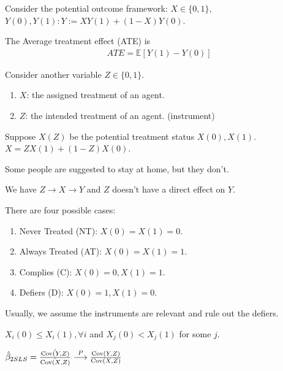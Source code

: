 \documentclass[11pt]{elegantbook}
\begin{document}
Consider the potential outcome framework: $X\in\{0,1\}$, $Y(0),Y(1): Y:=X Y(1)+(1-X)Y(0)$.

The Average treatment effect (ATE) is
\begin{equation}
    \begin{aligned}
        ATE=\mathbb{E}[Y(1)-Y(0)]
    \end{aligned}
    \nonumber
\end{equation}

Consider another variable $Z\in\{0,1\}$.
\begin{enumerate}
    \item $X$: the assigned treatment of an agent.
    \item $Z$: the intended treatment of an agent. (instrument)
\end{enumerate}

Suppose $X(Z)$ be the potential treatment status $X(0),X(1)$. $X=ZX(1)+(1-Z)X(0)$.

\begin{example}
    Some people are suggested to stay at home, but they don't.
\end{example}

We have $Z \rightarrow X \rightarrow Y$ and $Z$ doesn't have a direct effect on $Y$.

There are four possible cases:
\begin{enumerate}
    \item Never Treated (NT): $X(0)=X(1)=0$.
    \item Always Treated (AT): $X(0)=X(1)=1$.
    \item Complies (C): $X(0)=0,X(1)=1$.
    \item Defiers (D): $X(0)=1,X(1)=0$.
\end{enumerate}
Usually, we assume the instruments are relevant and rule out the defiers.
\begin{assumption}\label{ass:LATE}
    $X_i(0)\leq X_i(1),\forall i$ and $X_j(0)<X_j(1)$ for some $j$.
\end{assumption}

$\hat{\beta}_{2SLS}=\frac{\hat{\textnormal{Cov}(Y,Z)}}{\hat{\textnormal{Cov}(X,Z)}}\stackrel{P}{\longrightarrow}\frac{\textnormal{Cov}(Y,Z)}{\textnormal{Cov}(X,Z)}$
\end{document}

